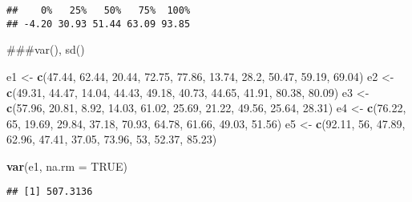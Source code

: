 \documentclass[
]{article}
\newenvironment{Shaded}{\begin{snugshade}}{\end{snugshade}}
\newcommand{\AttributeTok}[1]{\textcolor[rgb]{0.13,0.29,0.53}{#1}}
\newcommand{\ConstantTok}[1]{\textcolor[rgb]{0.56,0.35,0.01}{#1}}
\newcommand{\DecValTok}[1]{\textcolor[rgb]{0.00,0.00,0.81}{#1}}
\newcommand{\FloatTok}[1]{\textcolor[rgb]{0.00,0.00,0.81}{#1}}
\newcommand{\FunctionTok}[1]{\textcolor[rgb]{0.13,0.29,0.53}{\textbf{#1}}}
\newcommand{\NormalTok}[1]{#1}
\newcommand{\OtherTok}[1]{\textcolor[rgb]{0.56,0.35,0.01}{#1}}
\begin{document}
\begin{verbatim}
##    0%   25%   50%   75%  100% 
## -4.20 30.93 51.44 63.09 93.85
\end{verbatim}

\#\#\#var(), sd()

\begin{Shaded}
\begin{Highlighting}[]
\NormalTok{e1 }\OtherTok{\textless{}{-}} \FunctionTok{c}\NormalTok{(}\FloatTok{47.44}\NormalTok{, }\FloatTok{62.44}\NormalTok{, }\FloatTok{20.44}\NormalTok{, }\FloatTok{72.75}\NormalTok{, }\FloatTok{77.86}\NormalTok{, }\FloatTok{13.74}\NormalTok{, }\FloatTok{28.2}\NormalTok{, }\FloatTok{50.47}\NormalTok{, }\FloatTok{59.19}\NormalTok{, }\FloatTok{69.04}\NormalTok{)}
\NormalTok{e2 }\OtherTok{\textless{}{-}} \FunctionTok{c}\NormalTok{(}\FloatTok{49.31}\NormalTok{, }\FloatTok{44.47}\NormalTok{, }\FloatTok{14.04}\NormalTok{, }\FloatTok{44.43}\NormalTok{, }\FloatTok{49.18}\NormalTok{, }\FloatTok{40.73}\NormalTok{, }\FloatTok{44.65}\NormalTok{, }\FloatTok{41.91}\NormalTok{, }\FloatTok{80.38}\NormalTok{, }\FloatTok{80.09}\NormalTok{)}
\NormalTok{e3 }\OtherTok{\textless{}{-}} \FunctionTok{c}\NormalTok{(}\FloatTok{57.96}\NormalTok{, }\FloatTok{20.81}\NormalTok{, }\FloatTok{8.92}\NormalTok{, }\FloatTok{14.03}\NormalTok{, }\FloatTok{61.02}\NormalTok{, }\FloatTok{25.69}\NormalTok{, }\FloatTok{21.22}\NormalTok{, }\FloatTok{49.56}\NormalTok{, }\FloatTok{25.64}\NormalTok{, }\FloatTok{28.31}\NormalTok{)}
\NormalTok{e4 }\OtherTok{\textless{}{-}} \FunctionTok{c}\NormalTok{(}\FloatTok{76.22}\NormalTok{, }\DecValTok{65}\NormalTok{, }\FloatTok{19.69}\NormalTok{, }\FloatTok{29.84}\NormalTok{, }\FloatTok{37.18}\NormalTok{, }\FloatTok{70.93}\NormalTok{, }\FloatTok{64.78}\NormalTok{, }\FloatTok{61.66}\NormalTok{, }\FloatTok{49.03}\NormalTok{, }\FloatTok{51.56}\NormalTok{)}
\NormalTok{e5 }\OtherTok{\textless{}{-}} \FunctionTok{c}\NormalTok{(}\FloatTok{92.11}\NormalTok{, }\DecValTok{56}\NormalTok{, }\FloatTok{47.89}\NormalTok{, }\FloatTok{62.96}\NormalTok{, }\FloatTok{47.41}\NormalTok{, }\FloatTok{37.05}\NormalTok{, }\FloatTok{73.96}\NormalTok{, }\DecValTok{53}\NormalTok{, }\FloatTok{52.37}\NormalTok{, }\FloatTok{85.23}\NormalTok{)}

\FunctionTok{var}\NormalTok{(e1, }\AttributeTok{na.rm =} \ConstantTok{TRUE}\NormalTok{)}
\end{Highlighting}
\end{Shaded}

\begin{verbatim}
## [1] 507.3136
\end{verbatim}
\end{document}
